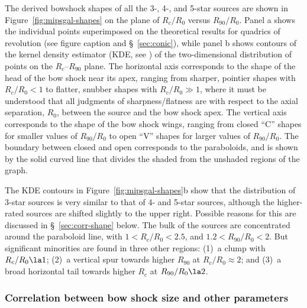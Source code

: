 The derived bowshock shapes of all the 3-, 4-, and 5-star sources are
shown in Figure~\ref{fig:mipsgal-shapes} on the plane of \(R_c/R_0\)
versus \(R_{90} / R_0\).  Panel a shows the individual points
superimposed on the theoretical results for quadrics of revolution
(see figure caption and \S~\ref{sec:conic}), while panel b shows
contours of the kernel density estimator (KDE, see
\citealp{Leiva-Murillo:2012a, Scott:2015a}) of the two-dimensional
distribution of points on the \(R_c\)--\(R_{90}\) plane.  The
horizontal axis corresponds to the shape of the head of the bow shock
near its apex, ranging from sharper, pointier shapes with
\(R_c/R_0 < 1\) to flatter, snubber shapes with \(R_c/R_0 \gg 1\), where
it must be understood that all judgments of sharpness/flatness are
with respect to the axial separation, \(R_0\), between the source and
the bow shock apex.  The vertical axis corresponds to the shape of the
bow shock wings, ranging from closed ``C'' shapes for smaller values
of \(R_{90} / R_0\) to open ``V'' shapes for larger values of
\(R_{90} / R_0\).  The boundary between closed and open corresponds to
the paraboloids, and is shown by the solid curved line that divides
the shaded from the unshaded regions of the graph.

The KDE contours in Figure~\ref{fig:mipsgal-shapes}b show that the
distribution of 3-star sources is very similar to that of 4- and
5-star sources, although the higher-rated sources are shifted slightly
to the upper right.  Possible reasons for this are discussed in
\S~\ref{sec:corr-shape} below.
The bulk of the sources are concentrated around the paraboloid line,
with \(1 < R_c/R_0 < 2.5\), and \(1.2 < R_{90}/R_0 < 2\).  But
significant minorities are found in three other regions: (1)~a clump
with \(R_c/R_0 \la 1\); (2)~a vertical spur towards higher \(R_{90}\)
at \(R_c/R_0 \approx 2\); and (3)~a broad horizontal tail towards higher
\(R_c\) at \(R_{90}/R_0 \la 2\).


\subsubsection{Correlation between bow shock size and other parameters}
\label{sec:corr-size}

